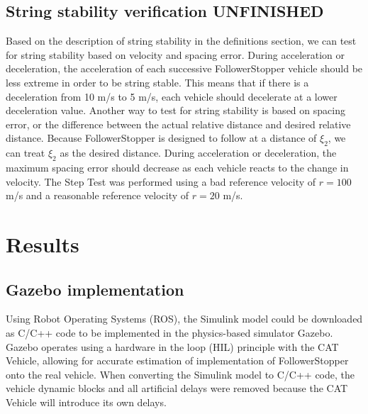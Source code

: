 \documentclass[conference]{IEEEtran}
\begin{document}
\subsection{String stability verification UNFINISHED}
Based on the description of string stability in the definitions section, we can test for string stability based on velocity and spacing error. During acceleration or deceleration, the acceleration of each successive FollowerStopper vehicle should be less extreme in order to be string stable. This means that if there is a deceleration from 10 m/s to 5 m/s, each vehicle should decelerate at a lower deceleration value. Another way to test for string stability is based on spacing error, or the difference between the actual relative distance and desired relative distance. Because FollowerStopper is designed to follow at a distance of $\xi_2$, we can treat $\xi_2$ as the desired distance. During acceleration or deceleration, the maximum spacing error should decrease as each vehicle reacts to the change in velocity. The Step Test was performed using a bad reference velocity of $r=100$ m/s and a reasonable reference velocity of $r=20$ m/s. 






\section{Results}

\subsection{Gazebo implementation}
Using Robot Operating Systems (ROS), the Simulink model could be downloaded as C/C++ code to be implemented in the physics-based simulator Gazebo. Gazebo operates using a hardware in the loop (HIL) principle with the CAT Vehicle, allowing for accurate estimation of implementation of FollowerStopper onto the real vehicle. When converting the Simulink model to C/C++ code, the vehicle dynamic blocks and all artificial delays were removed because the CAT Vehicle will introduce its own delays.
\end{document}
